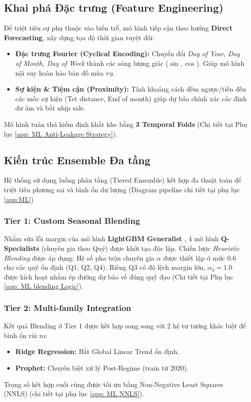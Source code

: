 \documentclass[10pt,a4paper]{article}
\begin{document}
\subsection{Khai phá Đặc trưng (Feature Engineering)}
Để triệt tiêu sự phụ thuộc vào biến trễ, mô hình tiếp cận theo hướng \textbf{Direct Forecasting}, xây dựng tọa độ thời gian tuyệt đối\citep{taylor2018forecasting}:
\begin{itemize}[leftmargin=*, nosep]
  \item \textbf{Đặc trưng Fourier (Cyclical Encoding):} Chuyển đổi \textit{Day of Year, Day of Month, Day of Week} thành các sóng lượng giác ($\sin, \cos$). Giúp mô hình nội suy hoàn hảo bản đồ mùa vụ.
  \item \textbf{Sự kiện \& Tiệm cận (Proximity):} Tính khoảng cách đếm ngược/tiến đến các mốc sự kiện (Tet distance, End of month) giúp dự báo chính xác các đỉnh dư âm và bắt nhịp sale.
\end{itemize}
Mô hình tuân thủ kiểm định khắt khe bằng \textbf{3 Temporal Folds} (Chi tiết tại Phụ lục \ref{app: ML Anti-Leakage Strategy}).
\subsection{Kiến trúc Ensemble Đa tầng}
Hệ thống sử dụng luồng phân tầng (Tiered Ensemble) kết hợp đa thuật toán để triệt tiêu phương sai và bình ổn dư lượng \citep{sagi2018ensemble} (Diagram pipeline chi tiết tại phụ lục \ref{app:ML})
\subsubsection{Tier 1: Custom Seasonal Blending}
Nhằm sửa lỗi margin của mô hình \textbf{LightGBM Generalist} \citep{ke2017lightgbm}, 4 mô hình \textbf{Q-Specialists} (chuyên gia theo Quý) được khởi tạo độc lập. Chiến lược \textit{Heuristic Blending} được áp dụng: Hệ số pha trộn chuyên gia $\alpha$ được thiết lập ở mức $0.6$ cho các quý ổn định (Q1, Q2, Q4). Riêng Q3 có độ lệch margin lớn, $\alpha_3 = 1.0$ được kích hoạt nhằm ép đường dự báo về đúng quỹ đạo (Chi tiết tại Phụ lục \ref{app: ML blending Logic}).
\subsubsection{Tier 2: Multi-family Integration}
Kết quả Blending ở Tier 1 được kết hợp song song với 2 hệ tư tưởng khác biệt để bình ổn rủi ro:
\begin{itemize}[leftmargin=*, nosep]
  \item \textbf{Ridge Regression\citep{hoerl1970ridge}:} Bắt Global Linear Trend ổn định.
  \item \textbf{Prophet\citep{taylor2018forecasting}:} Chuyên biệt xử lý Post-Regime (train từ 2020).
\end{itemize}
Trọng số kết hợp cuối cùng được tối ưu bằng Non-Negative Least Squares (NNLS) (chi tiết tại phụ lục \ref{app: ML NNLS}).
\end{document}
